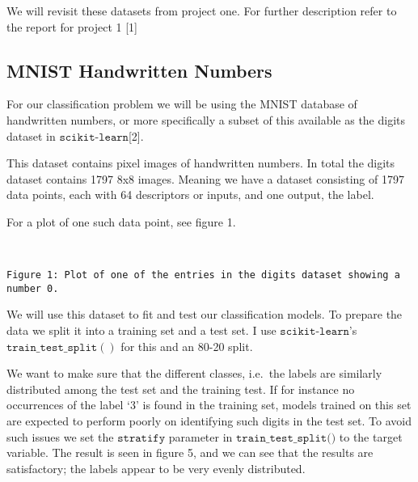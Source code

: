 \documentclass[11pt]{article}
\begin{document}
We will revisit these datasets from project one. For further description
refer to the report for project 1 {[}1{]}

    \hypertarget{mnist-handwritten-numbers}{%
\subsection{MNIST Handwritten Numbers}\label{mnist-handwritten-numbers}}

For our classification problem we will be using the MNIST database of
handwritten numbers, or more specifically a subset of this available as
the digits dataset in $\texttt{scikit-learn}${[}2{]}.

This dataset contains pixel images of handwritten numbers. In total the
digits dataset contains 1797 8x8 images. Meaning we have a dataset
consisting of 1797 data points, each with 64 descriptors or inputs, and
one output, the label.

For a plot of one such data point, see figure 1.

    \begin{center}
    \end{center}
    { \hspace*{\fill} \\}
    
    \begin{Verbatim}[commandchars=\\\{\}]
Figure 1: Plot of one of the entries in the digits dataset showing a number 0.
    \end{Verbatim}

    We will use this dataset to fit and test our classification models. To
prepare the data we split it into a training set and a test set. I use
\(\texttt{scikit-learn}\)'s \(\texttt{train\_test\_split}()\) for this and
an 80-20 split.


    We want to make sure that the different classes, i.e.~the labels are
similarly distributed among the test set and the training test. If for
instance no occurrences of the label `3' is found in the training set,
models trained on this set are expected to perform poorly on identifying
such digits in the test set. To avoid such issues we set the
\(\texttt{stratify}\) parameter in \(\texttt{train\_test\_split()}\) to
the target variable. The result is seen in figure 5, and we can see that
the results are satisfactory; the labels appear to be very evenly
distributed.
\end{document}
